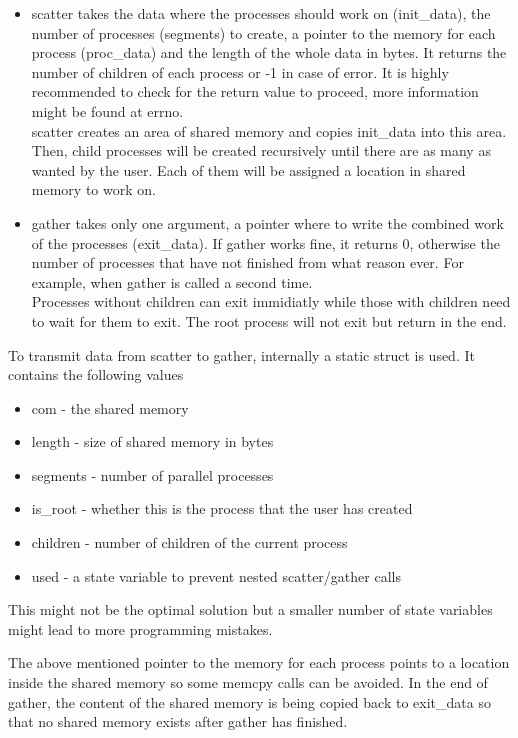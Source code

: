 \documentclass[a4paper]{article}
\begin{document}
\begin{itemize}
    \item {scatter takes the data where the processes should work on (init\_data), the number of processes (segments) to create, a pointer to the memory for each process (proc\_data) and the length of the whole data in bytes. It returns the number of children of each process or -1 in case of error. It is highly recommended to check for the return value to proceed, more information might be found at errno. \\
    scatter creates an area of shared memory and copies init\_data into this area. Then, child processes will be created recursively until there are as many as wanted by the user. Each of them will be assigned a location in shared memory to work on. }
    \item {gather takes only one argument, a pointer where to write the combined work of the processes (exit\_data). If gather works fine, it returns 0, otherwise the number of processes that have not finished from what reason ever. For example, when gather is called a second time. \\
    Processes without children can exit immidiatly while those with children need to wait for them to exit. The root process will not exit but return in the end.}
\end{itemize}

To transmit data from scatter to gather, internally a static struct is used. It contains the following values

\begin{itemize}
    \item com - the shared memory
    \item length - size of shared memory in bytes
    \item segments - number of parallel processes
    \item is\_root - whether this is the process that the user has created
    \item children - number of children of the current process
    \item used - a state variable to prevent nested scatter/gather calls
\end{itemize}

This might not be the optimal solution but a smaller number of state variables might lead to more programming mistakes.

The above mentioned pointer to the memory for each process points to a location inside the shared memory so some memcpy calls can be avoided. In the end of gather, the content of the shared memory is being copied back to exit\_data so that no shared memory exists after gather has finished. 
\end{document}
